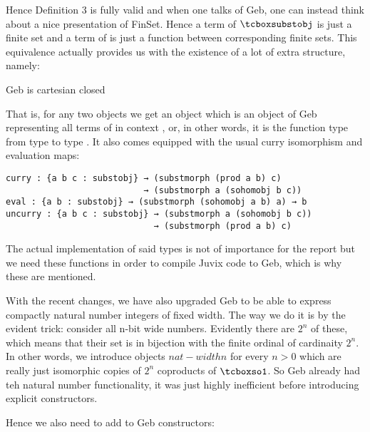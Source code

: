 Hence Definition 3 is fully valid and when one talks of Geb, one can instead think about a nice presentation of FinSet. Hence a term of $\gebobj$ is just a finite set and a term of  is just a function between corresponding finite sets. This equivalence actually provides us with the existence of a lot of extra structure, namely:

\begin{corollary}
Geb is cartesian closed
\end{corollary}

That is, for any two objects  we get an object  which is an object of Geb representing all terms of  in context , or, in other words, it is the function type from type  to type . It also comes equipped with the usual curry isomorphism and evaluation maps:

\begin{verbatim}
curry : {a b c : substobj} → (substmorph (prod a b) c) 
                           → (substmorph a (sohomobj b c))
eval : {a b : substobj} → (substmorph (sohomobj a b) a) → b
uncurry : {a b c : substobj} → (substmorph a (sohomobj b c)) 
                             → (substmorph (prod a b) c)
\end{verbatim}

The actual implementation of said types is not of importance for the report but we need these functions in order to compile Juvix code to Geb, which is why these are mentioned. 

With the recent changes, we have also upgraded Geb to be able to express compactly natural number integers of fixed width. The way we do it is by the evident trick: consider all n-bit wide numbers. Evidently there are $2^n$ of these, which means that their set is in bijection with the finite ordinal of cardinaity $2^n$. In other words, we introduce objects $nat-width n$ for every $n > 0$ which are really just isomorphic copies of $2^n$ coproducts of $\gebterm$. So Geb already had teh natural number functionality, it was just highly inefficient before introducing explicit constructors.

Hence we also need to add to Geb constructors:

